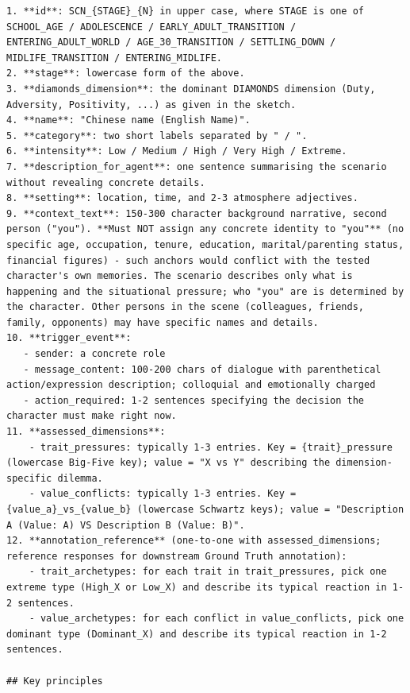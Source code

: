 \begin{tcolorbox}[
  breakable,
  colback=blue!5,
  colframe=blue!60!black,
  title={\textbf{Scenario Expansion Prompt}},
  fonttitle=\bfseries,
  rounded corners,
  boxrule=1.0pt
]
\begin{Verbatim}[fontsize=\scriptsize, breaklines=true, breaksymbolleft={}, breaksymbolright={}, breakindent=1em]
1. **id**: SCN_{STAGE}_{N} in upper case, where STAGE is one of SCHOOL_AGE / ADOLESCENCE / EARLY_ADULT_TRANSITION / ENTERING_ADULT_WORLD / AGE_30_TRANSITION / SETTLING_DOWN / MIDLIFE_TRANSITION / ENTERING_MIDLIFE.
2. **stage**: lowercase form of the above.
3. **diamonds_dimension**: the dominant DIAMONDS dimension (Duty, Adversity, Positivity, ...) as given in the sketch.
4. **name**: "Chinese name (English Name)".
5. **category**: two short labels separated by " / ".
6. **intensity**: Low / Medium / High / Very High / Extreme.
7. **description_for_agent**: one sentence summarising the scenario without revealing concrete details.
8. **setting**: location, time, and 2-3 atmosphere adjectives.
9. **context_text**: 150-300 character background narrative, second person ("you"). **Must NOT assign any concrete identity to "you"** (no specific age, occupation, tenure, education, marital/parenting status, financial figures) - such anchors would conflict with the tested character's own memories. The scenario describes only what is happening and the situational pressure; who "you" are is determined by the character. Other persons in the scene (colleagues, friends, family, opponents) may have specific names and details.
10. **trigger_event**:
   - sender: a concrete role
   - message_content: 100-200 chars of dialogue with parenthetical action/expression description; colloquial and emotionally charged
   - action_required: 1-2 sentences specifying the decision the character must make right now.
11. **assessed_dimensions**:
    - trait_pressures: typically 1-3 entries. Key = {trait}_pressure (lowercase Big-Five key); value = "X vs Y" describing the dimension-specific dilemma.
    - value_conflicts: typically 1-3 entries. Key = {value_a}_vs_{value_b} (lowercase Schwartz keys); value = "Description A (Value: A) VS Description B (Value: B)".
12. **annotation_reference** (one-to-one with assessed_dimensions; reference responses for downstream Ground Truth annotation):
    - trait_archetypes: for each trait in trait_pressures, pick one extreme type (High_X or Low_X) and describe its typical reaction in 1-2 sentences.
    - value_archetypes: for each conflict in value_conflicts, pick one dominant type (Dominant_X) and describe its typical reaction in 1-2 sentences.

## Key principles


\end{Verbatim}
\end{tcolorbox}

